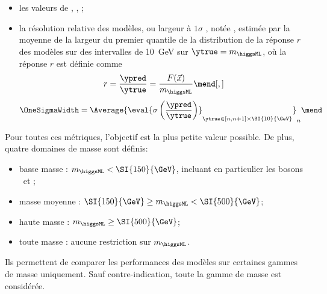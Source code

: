 \begin{itemize}
\item les valeurs de
\LossMSE,
\LossMAE,
\LossMAPE;
\item la résolution relative des modèles,
ou \og largeur à $1\sigma$ \fg,
notée \OneSigmaWidth,
estimée par
la moyenne
de
la largeur du premier quantile de la distribution de la réponse $r$ des modèles
sur des intervalles de \SI{10}{\GeV} sur $\ytrue=m_{\higgsML}$,
où la réponse $r$ est définie comme
\begin{equation}
r = \frac{\ypred}{\ytrue} = \frac{F(\vec{x})}{m_{\higgsML}}
\mend[,]
\end{equation}
\ie
\begin{equation}
\OneSigmaWidth = \Average{\eval{\sigma\left(\frac{\ypred}{\ytrue}\right)}_{\ytrue\in [n, n+1]\times\SI{10}{\GeV}}}_n
\mend
\end{equation}
\end{itemize}
Pour toutes ces métriques, l'objectif est la plus petite valeur possible.
De plus, quatre domaines de masse sont définis:
\begin{itemize}
\item basse masse : $m_{\higgsML} < \SI{150}{\GeV}$, incluant en particulier les bosons \Zboson\ et \higgs;
\item masse moyenne : $\SI{150}{\GeV} \geq m_{\higgsML} < \SI{500}{\GeV}$;
\item haute masse : $m_{\higgsML} \geq \SI{500}{\GeV}$;
\item toute masse : aucune restriction sur $m_{\higgsML}$.
\end{itemize}
Ils permettent de comparer les performances des modèles sur certaines gammes de masse uniquement.
Sauf contre-indication, toute la gamme de masse est considérée.
